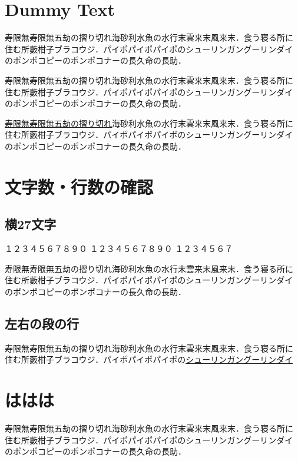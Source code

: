 \documentclass[a4j, 12Q, twocolumn, twoside]{jsarticle}
\begin{document}
\section{Dummy Text}
寿限無寿限無五劫の摺り切れ海砂利水魚の水行末雲来末風来末．食う寝る所に
住む所藪柑子ブラコウジ．パイポパイポパイポのシューリンガングーリンダイ
のポンポコピーのポンポコナーの長久命の長助．

寿限無寿限無五劫の摺り切れ海砂利水魚の水行末雲来末風来末．食う寝る所に
住む所藪柑子ブラコウジ．パイポパイポパイポのシューリンガングーリンダイ
のポンポコピーのポンポコナーの長久命の長助．

\underline{寿限無寿限無五劫の摺り切れ}海砂利水魚の水行末雲来末風来末．食う寝る所に
住む所藪柑子ブラコウジ．パイポパイポパイポのシューリンガングーリンダイ
のポンポコピーのポンポコナーの長久命の長助．


\clearpage
\appendix
\section{文字数・行数の確認}
\subsection{横27文字}
\noindent
１２３４５６７８９０
１２３４５６７８９０
１２３４５６７%

寿限無寿限無五劫の摺り切れ海砂利水魚の水行末雲来末風来末．食う寝る所に
住む所藪柑子ブラコウジ．パイポパイポパイポのシューリンガングーリンダイ
のポンポコピーのポンポコナーの長久命の長助．

\subsection{左右の段の行}


寿限無寿限無五劫の摺り切れ海砂利水魚の水行末雲来末風来末．食う寝る所に
住む所藪柑子ブラコウジ．パイポパイポパイポの\underline{シューリンガングーリンダイ}


\section{ははは}
寿限無寿限無五劫の摺り切れ海砂利水魚の水行末雲来末風来末．食う寝る所に
住む所藪柑子ブラコウジ．パイポパイポパイポのシューリンガングーリンダイ
のポンポコピーのポンポコナーの長久命の長助．
\end{document}
